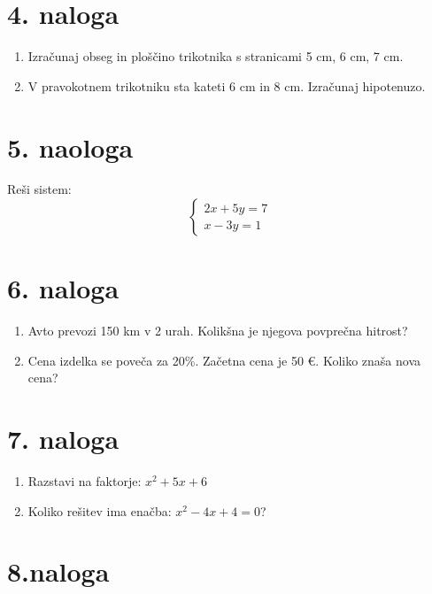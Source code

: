 \documentclass[a4paper,12pt]{article}
\begin{document}
\section*{4. naloga }
\begin{enumerate}
\item Izračunaj obseg in ploščino trikotnika s stranicami 5 cm, 6 cm, 7 cm.
\item V pravokotnem trikotniku sta kateti 6 cm in 8 cm. Izračunaj hipotenuzo.
\end{enumerate}

\vspace{2cm}

\section*{5. naologa }
Reši sistem:
\[
\begin{cases}
2x + 5y = 7 \\
x - 3y = 1
\end{cases}
\]

\vspace{2cm}

\section*{6. naloga}
\begin{enumerate}
\item Avto prevozi 150 km v 2 urah. Kolikšna je njegova povprečna hitrost?
\item Cena izdelka se poveča za 20\%. Začetna cena je 50 €. Koliko znaša nova cena?
\end{enumerate}

\section*{7. naloga}
\begin{enumerate}
\item Razstavi na faktorje: $x^2 + 5x + 6$
\item Koliko rešitev ima enačba: $x^2 - 4x + 4 = 0$?
\end{enumerate}

\newpage

\section*{8.naloga}
\end{document}
